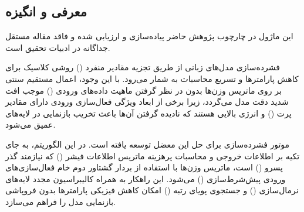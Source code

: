\subsection{معرفی و انگیزه}
این ماژول در چارچوب پژوهش حاضر پیاده‌سازی و ارزیابی شده و فاقد مقاله مستقل جداگانه در ادبیات تحقیق است.

فشرده‌سازی مدل‌های زبانی از طریق تجزیه مقادیر منفرد () روشی کلاسیک برای کاهش پارامترها و تسریع محاسبات به شمار می‌رود. با این وجود، اعمال مستقیم  سنتی بر روی ماتریس وزن‌ها بدون در نظر گرفتن ماهیت داده‌های ورودی () موجب افت شدید دقت مدل می‌گردد، زیرا برخی از ابعاد ویژگی فعال‌سازی ورودی دارای مقادیر پرت () و انرژی بالایی هستند که نادیده گرفتن آن‌ها باعث تخریب بازنمایی در لایه‌های عمیق می‌شود.

موتور فشرده‌سازی  برای حل این معضل توسعه یافته است. در این الگوریتم، به جای تکیه بر اطلاعات خروجی و محاسبات پرهزینه ماتریس اطلاعات فیشر () که نیازمند گذر پسرو () است، ماتریس وزن‌ها با استفاده از بردار گشتاور دوم خام فعال‌سازی‌های ورودی پیش‌شرط‌سازی () می‌شود. این راهکار به همراه کالیبراسیون مجدد لایه‌های نرمال‌سازی () و جستجوی پویای رتبه () امکان کاهش فیزیکی پارامترها بدون فروپاشی بازنمایی مدل را فراهم می‌سازد.
